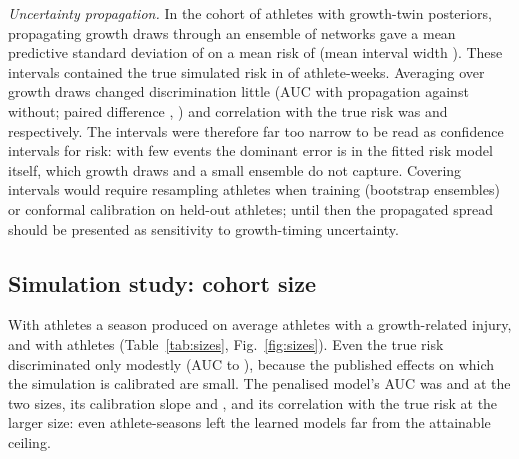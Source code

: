 \documentclass[journal]{IEEEtran}
\begin{document}
\emph{Uncertainty propagation.} In the cohort of \PropAthletes{} athletes with growth-twin
posteriors, propagating \PropDraws{} growth draws through an ensemble of \PropEnsemble{}
networks gave a mean predictive standard deviation of \PropSD{} on a mean risk of
\PropRisk{} (mean \SpecInterval{} interval width \PropWidth{}). These intervals contained the
true simulated risk in \PropCoverage{} of athlete-weeks. Averaging over growth draws changed
discrimination little (AUC \PropAucWith{} with propagation against \PropAucWithout{} without;
paired difference \PropDiff{}, \PropDiffCI{}) and correlation with the true risk was
\PropCorrWith{} and \PropCorrWithout{} respectively. The intervals were therefore far too narrow
to be read as confidence intervals for risk: with few events the dominant error is in the
fitted risk model itself, which growth draws and a small ensemble do not capture. Covering
intervals would require resampling athletes when training (bootstrap ensembles) or conformal
calibration on held-out athletes; until then the propagated spread should be presented as
sensitivity to growth-timing uncertainty.

\begin{table}[!t]
\caption{Conditioning ablation (SYNTHETIC), growth-related injury.}
\label{tab:ablation}
\centering
\resizebox{\columnwidth}{!}{}
\end{table}

\subsection{Simulation study: cohort size}
With \SizeSmall{} athletes a season produced on average \SizeEventsSmall{} athletes with a
growth-related injury, and \SizeEventsLarge{} with \SizeLarge{} athletes (Table~\ref{tab:sizes},
Fig.~\ref{fig:sizes}). Even the true risk discriminated only modestly (AUC \SizeTrueAucSmall{}
to \SizeTrueAucLarge{}), because the published effects on which the simulation is calibrated
are small. The penalised model's AUC was \SizeLogitAucSmall{} and \SizeLogitAucLarge{} at the
two sizes, its calibration slope \SizeLogitSlopeSmall{} and \SizeLogitSlopeLarge{}, and its
correlation with the true risk \SizeCorrLogitLarge{} at the larger size: even \SizeLarge{}
athlete-seasons left the learned models far from the attainable ceiling.

\begin{table}[!t]
\caption{Out-of-fold performance against cohort size (SYNTHETIC). Mean and range across
independent simulated cohorts.}
\label{tab:sizes}
\centering

\end{table}
\end{document}
